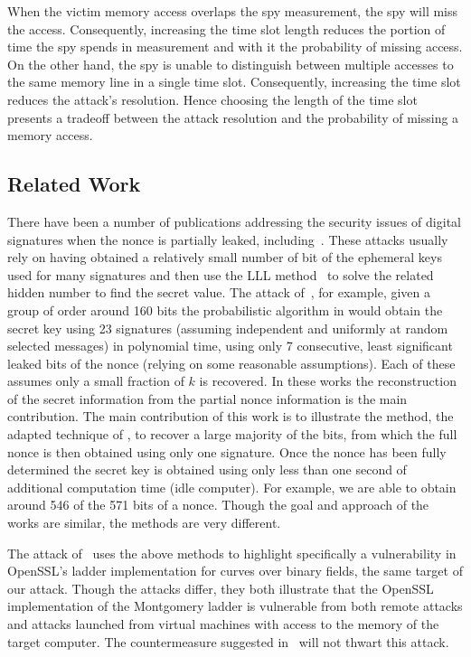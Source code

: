 \documentclass{llncs}
\begin{document}
When the victim memory access overlaps the spy measurement, the spy will miss the access.
Consequently, increasing the time slot length reduces the portion of time the spy spends in
measurement and with it the probability of missing access.
On the other hand, the spy is unable to distinguish between multiple accesses to the same memory line in 
a single time slot.
Consequently, increasing the time slot reduces the attack's resolution.
Hence choosing the length of the time slot presents a tradeoff between the attack resolution
and the probability of missing a memory access.


\subsection{Related Work}\label{sec:related}
There have been a number of publications addressing the security issues of digital signatures when the nonce is partially leaked, including~\cite{Howgrave-GrahamS01,gopalakrishnan07solving,nguyen03insecurity}. These attacks usually rely on having obtained a relatively small number of bit of the ephemeral keys used for many signatures and then use the LLL method~\cite{LLL} to solve the related hidden number to find the secret value. The attack of~\cite{nguyen03insecurity}, for example, given a group of order around 160 bits the probabilistic algorithm in would obtain the secret key using 23 signatures (assuming independent and uniformly at random selected messages) in polynomial time, using only 7 consecutive, least significant leaked bits of the nonce (relying on some reasonable assumptions). Each of these assumes only a small fraction of $k$ is recovered. In these works the reconstruction of the secret information from the partial nonce information is the main contribution. The main contribution of this work is to illustrate the method, the adapted technique of \cite{yarom13flush}, to recover a large majority of the bits, from which the full nonce is then obtained using only one signature. Once the nonce has been fully determined the secret key is obtained using only less than one second of additional computation time (idle computer). 
For example, we are able to obtain around 546 of the 571 bits of a nonce. Though the goal and approach of the works are similar, the methods are very different.

The attack of~\cite{brumley11remote} uses the above methods to highlight specifically a vulnerability in OpenSSL's ladder implementation for curves over binary fields, the same target of our attack. Though the attacks differ, they both illustrate that the OpenSSL implementation of the Montgomery ladder is vulnerable from both remote attacks and attacks launched from virtual machines with access to the memory of the target computer. The countermeasure suggested in~\cite{brumley11remote} will not thwart this attack.
\end{document}

